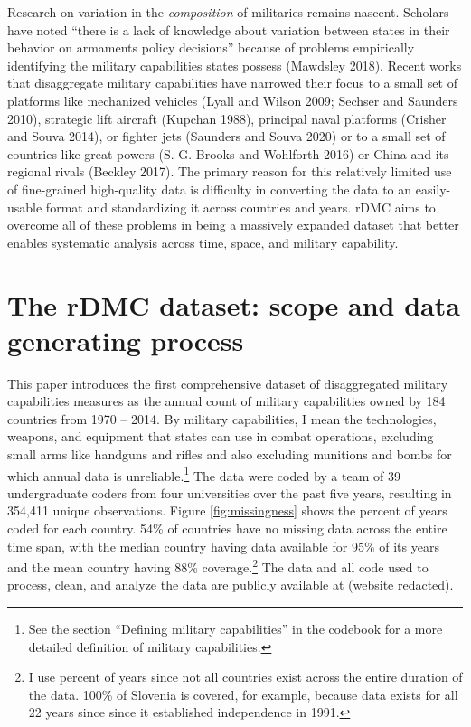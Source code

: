 \documentclass[
]{article}
\begin{document}
Research on variation in the \emph{composition} of militaries remains nascent. Scholars have noted ``there is a lack of knowledge about variation between states in their behavior on armaments policy decisions'' because of problems empirically identifying the military capabilities states possess (Mawdsley 2018). Recent works that disaggregate military capabilities have narrowed their focus to a small set of platforms like mechanized vehicles (Lyall and Wilson 2009; Sechser and Saunders 2010), strategic lift aircraft (Kupchan 1988), principal naval platforms (Crisher and Souva 2014), or fighter jets (Saunders and Souva 2020) or to a small set of countries like great powers (S. G. Brooks and Wohlforth 2016) or China and its regional rivals (Beckley 2017). The primary reason for this relatively limited use of fine-grained high-quality data is difficulty in converting the data to an easily-usable format and standardizing it across countries and years. rDMC aims to overcome all of these problems in being a massively expanded dataset that better enables systematic analysis across time, space, and military capability.

\hypertarget{the-rdmc-dataset-scope-and-data-generating-process}{%
\section{The rDMC dataset: scope and data generating process}\label{the-rdmc-dataset-scope-and-data-generating-process}}

This paper introduces the first comprehensive dataset of disaggregated military capabilities measures as the annual count of military capabilities owned by 184 countries from 1970 -- 2014. By military capabilities, I mean the technologies, weapons, and equipment that states can use in combat operations, excluding small arms like handguns and rifles and also excluding munitions and bombs for which annual data is unreliable.\footnote{See the section ``Defining military capabilities'' in the codebook for a more detailed definition of military capabilities.} The data were coded by a team of 39 undergraduate coders from four universities over the past five years, resulting in 354,411 unique observations. Figure \ref{fig:missingness} shows the percent of years coded for each country. 54\% of countries have no missing data across the entire time span, with the median country having data available for 95\% of its years and the mean country having 88\% coverage.\footnote{I use percent of years since not all countries exist across the entire duration of the data. 100\% of Slovenia is covered, for example, because data exists for all 22 years since since it established independence in 1991.} The data and all code used to process, clean, and analyze the data are publicly available at (website redacted).
\end{document}

